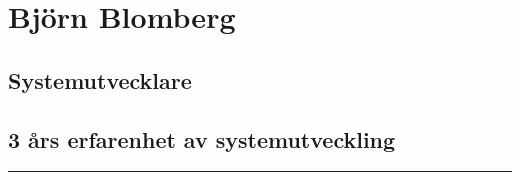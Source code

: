 \documentclass{article}
\begin{document}
\begin{minipage}[t]{0.7\textwidth}
\titleformat{\section}{\Huge\bfseries}{\thesection}{1em}{}
\section*{\textcolor{colorBlue}{Björn Blomberg}}
\subsection*{\textcolor{colorRed}{Systemutvecklare}}
\subsection*{3 års erfarenhet av systemutveckling}
\rule{7.7cm}{0.4pt}
\titleformat{\section}{\Large\bfseries}{\thesection}{1em}{}
\vspace{1.5cm}
\end{minipage}%
\begin{minipage}[t]{0.3\textwidth}
\vspace{-10pt} %
\end{minipage}%
\end{document}
